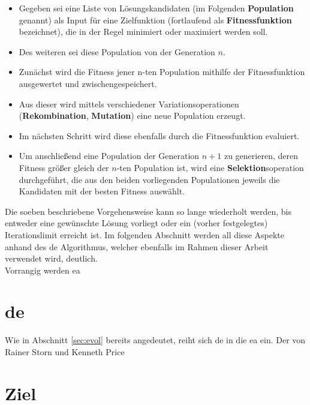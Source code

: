 		\begin{itemize}
			\item Gegeben sei eine Liste von Lösungskandidaten (im Folgenden \textbf{Population} genannt) als Input für eine Zielfunktion (fortlaufend als \textbf{Fitnessfunktion} bezeichnet), die in der Regel minimiert oder maximiert werden soll.
			\item Des weiteren sei diese Population von der Generation $n$.
			\item Zunächst wird die Fitness jener n-ten Population mithilfe der Fitnessfunktion ausgewertet und zwischengespeichert. 
			\item Aus dieser wird mittels verschiedener Variationsoperationen (\textbf{Rekombination}, \textbf{Mutation}) eine neue Population  erzeugt.
			\item Im nächsten Schritt wird diese ebenfalls durch die Fitnessfunktion evaluiert.
			\item Um anschließend eine Population der Generation $n+1$ zu generieren, deren Fitness größer gleich der $n$-ten Population ist, wird eine \textbf{Selektion}soperation durchgeführt, die aus den beiden vorliegenden Populationen jeweils die Kandidaten mit der besten Fitness auswählt.
		\end{itemize}
		
		Die soeben beschriebene Vorgehensweise kann so lange wiederholt werden, 
		bis entweder eine gewünschte Lösung vorliegt oder ein (vorher 
		festgelegtes) Iterationslimit erreicht ist. Im folgenden Abschnitt 
		werden all diese Aspekte anhand des \gls{de} Algorithmus, welcher 
		ebenfalls im Rahmen dieser Arbeit verwendet wird, deutlich.\\
		
		Vorrangig werden \gls{ea}
		
	
	\section{\gls{de}}
	\label{sec:de}
	
	Wie in Abschnitt \ref{sec:evol} bereits angedeutet, reiht sich \gls{de} in 
	die \gls{ea} ein. Der von Rainer Storn und Kenneth Price 
	\cite{storn-price-de} 
	
	\section{Ziel}
	\label{sec:ziel}
	
